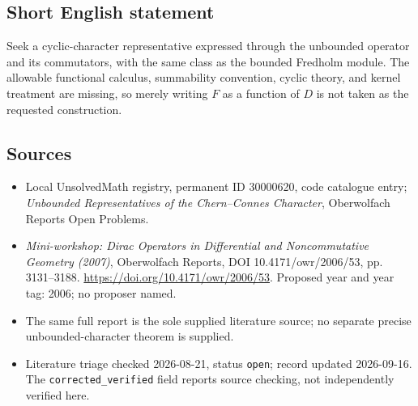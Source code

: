 \documentclass[11pt]{article}
\begin{document}
\subsection{Short English statement}
Seek a cyclic-character representative expressed through the unbounded operator and its commutators, with the same class as the bounded Fredholm module. The allowable functional calculus, summability convention, cyclic theory, and kernel treatment are missing, so merely writing \(F\) as a function of \(D\) is not taken as the requested construction.
\subsection{Sources}
\begin{itemize}\item Local UnsolvedMath registry, permanent ID 30000620, code catalogue entry; \emph{Unbounded Representatives of the Chern--Connes Character}, Oberwolfach Reports Open Problems.\item \emph{Mini-workshop: Dirac Operators in Differential and Noncommutative Geometry (2007)}, Oberwolfach Reports, DOI 10.4171/owr/2006/53, pp. 3131--3188. \url{https://doi.org/10.4171/owr/2006/53}. Proposed year and year tag: 2006; no proposer named.\item The same full report is the sole supplied literature source; no separate precise unbounded-character theorem is supplied.\item Literature triage checked 2026-08-21, status \texttt{open}; record updated 2026-09-16. The \texttt{corrected\_verified} field reports source checking, not independently verified here.\end{itemize}
\end{document}
